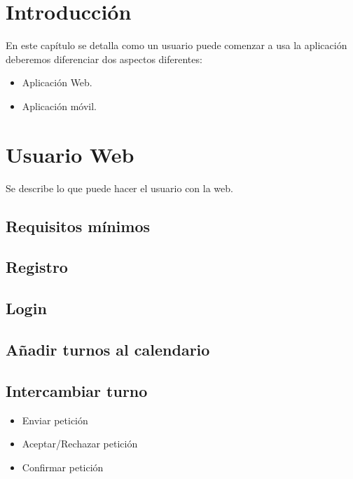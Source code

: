 
\section{Introducción}\label{introduccion-usuario}
En este capítulo se detalla como un usuario puede comenzar a usa la aplicación 
deberemos diferenciar dos aspectos diferentes:

\begin{itemize}
\tightlist
\item
  Aplicación Web. 
\item
  Aplicación móvil. 
\end{itemize}

\section{Usuario Web}
Se describe lo que puede hacer el usuario con la web. 

\subsection{Requisitos mínimos}


\subsection{Registro}

\subsection{Login}

\subsection{Añadir turnos al calendario}

\subsection{Intercambiar turno}

\begin{itemize}

\item Enviar petición

\item Aceptar/Rechazar petición

\item Confirmar petición

\end{itemize}


